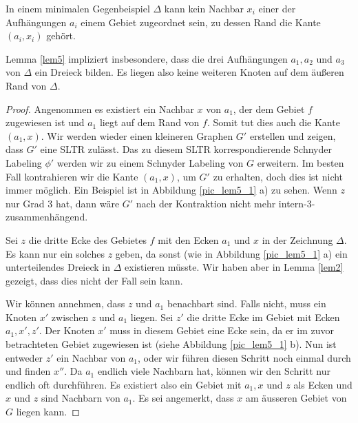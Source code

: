\begin{lemma}\label{lem5}
In einem minimalen Gegenbeispiel $\Delta$ kann kein Nachbar $x_i$ einer der Aufhängungen $a_i$ einem Gebiet zugeordnet sein, zu dessen Rand die Kante $(a_i,x_i)$ gehört.
\end{lemma}

\begin{remark}
Lemma \ref{lem5} impliziert insbesondere, dass die drei Aufhängungen $a_1,a_2$ und $a_3$ von $\Delta$ ein Dreieck bilden. Es liegen also keine weiteren Knoten auf dem äußeren Rand von $\Delta$.
\end{remark}

\begin{proof}
Angenommen es existiert ein Nachbar $x$ von $a_1$, der dem Gebiet $f$ zugewiesen ist und $a_1$ liegt auf dem Rand von $f$. Somit tut dies auch die Kante $(a_1,x)$. Wir werden wieder einen kleineren Graphen $G'$ erstellen und zeigen, dass $G'$ eine SLTR zulässt. Das zu diesem SLTR korrespondierende Schnyder Labeling $\phi'$ werden wir zu einem Schnyder Labeling von $G$ erweitern. Im besten Fall kontrahieren wir die Kante $(a_1,x)$, um $G'$ zu erhalten, doch dies ist nicht immer möglich. Ein Beispiel ist in Abbildung \ref{pic_lem5_1} a) zu sehen. Wenn $z$ nur Grad 3 hat, dann wäre $G'$ nach der Kontraktion nicht mehr intern-3-zusammenhängend.

Sei $z$ die dritte Ecke des Gebietes $f$ mit den Ecken $a_1$ und $x$ in der Zeichnung $\Delta$. Es kann nur ein solches $z$ geben, da sonst (wie in Abbildung \ref{pic_lem5_1} a) ein unterteilendes Dreieck in $\Delta$ existieren müsste. Wir haben aber in Lemma \ref{lem2} gezeigt, dass dies nicht der Fall sein kann.

Wir können annehmen, dass $z$ und $a_1$ benachbart sind. Falls nicht, muss ein Knoten $x'$ zwischen $z$ und $a_1$ liegen. Sei $z'$ die dritte Ecke im Gebiet mit Ecken $a_1,x',z'$. Der Knoten $x'$ muss in diesem Gebiet eine Ecke sein, da er im zuvor betrachteten Gebiet zugewiesen ist (siehe Abbildung \ref{pic_lem5_1} b). Nun ist entweder $z'$ ein Nachbar von $a_1$, oder wir führen diesen Schritt noch einmal durch und finden $x''$. Da $a_1$ endlich viele Nachbarn hat, können wir den Schritt nur endlich oft durchführen. Es existiert also ein Gebiet mit $a_1, x$ und $z$ als Ecken und $x$ und $z$ sind Nachbarn von $a_1$. Es sei angemerkt, dass $x$ am äusseren Gebiet von $G$ liegen kann.


\end{proof}
